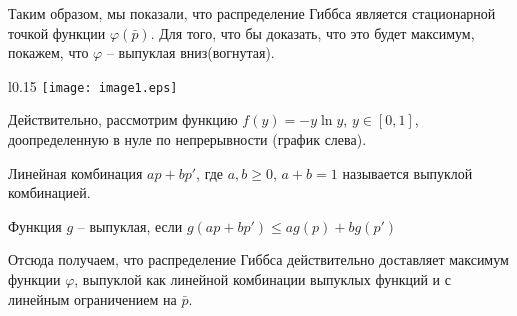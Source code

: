 Таким образом, мы показали, что распределение Гиббса является
стационарной точкой функции $φ(\bar p)$. Для того, что бы доказать,
что это будет максимум, покажем, что $φ$ -- выпуклая вниз(вогнутая).

\begin{wrapfigure}{l}{0.15\textwidth}
    \texttt{[image: image1.eps]}
\end{wrapfigure}
Действительно, рассмотрим функцию $f(y) =-y\ln y$, $y∈[0,1]$,
доопределенную в нуле по непрерывности (график слева).

\begin{df}
  Линейная комбинация $ap+bp'$, где $a,b≥0$, $a+b = 1$ называется
  выпуклой комбинацией.
\end{df}

\begin{df}
  Функция $g$ -- выпуклая, если $ g(ap+bp') ≤ag(p)+bg(p') $
\end{df}

Отсюда получаем, что распределение Гиббса действительно доставляет
максимум функции $φ$, выпуклой как линейной комбинации выпуклых
функций и с линейным ограничением на $\bar p$.

